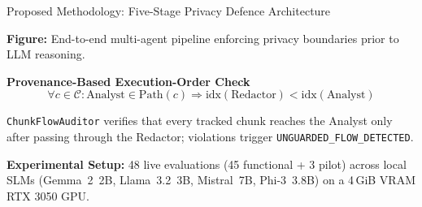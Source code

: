 \documentclass{article}
\newcommand{\smallsize}{\fontsize{13}{17}\selectfont}
\newcommand{\figcaption}[1]{{\smallsize\color{iitgray}\textbf{Figure:} #1\par}}
\newcommand{\subhead}[1]{{\color{iitmaroon}\bfseries #1}}
\begin{document}
\begin{posterblock}{}{Proposed Methodology: Five-Stage Privacy Defence Architecture}
\begin{minipage}[t]{0.57\linewidth}
\vspace{0.4em}
\figcaption{End-to-end multi-agent pipeline enforcing privacy boundaries prior to LLM reasoning.}
\end{minipage}%
\hfill
\begin{minipage}[t]{0.41\linewidth}\vspace{0pt}
\subhead{Provenance-Based Execution-Order Check}
\[
\forall c \in \mathcal{C} : \text{Analyst} \in \text{Path}(c) \Longrightarrow \text{idx}(\text{Redactor}) < \text{idx}(\text{Analyst})
\]
{\smallsize \texttt{ChunkFlowAuditor} verifies that every tracked chunk reaches the Analyst only after passing through the Redactor; violations trigger \texttt{UNGUARDED\_FLOW\_DETECTED}.\par}
\vspace{0.15em}
\subhead{Experimental Setup:} 48 live evaluations (45 functional + 3 pilot) across local SLMs (Gemma~2~2B, Llama~3.2~3B, Mistral~7B, Phi-3~3.8B) on a 4\,GiB VRAM RTX 3050 GPU.
\end{minipage}
\end{posterblock}
\end{document}
